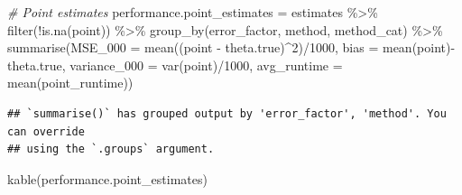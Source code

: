 \documentclass[
]{article}
\newenvironment{Shaded}{\begin{snugshade}}{\end{snugshade}}
\newcommand{\AttributeTok}[1]{\textcolor[rgb]{0.77,0.63,0.00}{#1}}
\newcommand{\CommentTok}[1]{\textcolor[rgb]{0.56,0.35,0.01}{\textit{#1}}}
\newcommand{\DecValTok}[1]{\textcolor[rgb]{0.00,0.00,0.81}{#1}}
\newcommand{\FunctionTok}[1]{\textcolor[rgb]{0.00,0.00,0.00}{#1}}
\newcommand{\NormalTok}[1]{#1}
\newcommand{\OtherTok}[1]{\textcolor[rgb]{0.56,0.35,0.01}{#1}}
\newcommand{\SpecialCharTok}[1]{\textcolor[rgb]{0.00,0.00,0.00}{#1}}
\begin{document}
\begin{Shaded}
\begin{Highlighting}[]
\CommentTok{\# Point estimates}
\NormalTok{performance.point\_estimates }\OtherTok{=}\NormalTok{ estimates }\SpecialCharTok{\%\textgreater{}\%}
  \FunctionTok{filter}\NormalTok{(}\SpecialCharTok{!}\FunctionTok{is.na}\NormalTok{(point)) }\SpecialCharTok{\%\textgreater{}\%}
  \FunctionTok{group\_by}\NormalTok{(error\_factor, method, method\_cat) }\SpecialCharTok{\%\textgreater{}\%}
  \FunctionTok{summarise}\NormalTok{(}\AttributeTok{MSE\_000 =} \FunctionTok{mean}\NormalTok{((point }\SpecialCharTok{{-}}\NormalTok{ theta.true)}\SpecialCharTok{\^{}}\DecValTok{2}\NormalTok{)}\SpecialCharTok{/}\DecValTok{1000}\NormalTok{,}
            \AttributeTok{bias =} \FunctionTok{mean}\NormalTok{(point)}\SpecialCharTok{{-}}\NormalTok{theta.true,}
            \AttributeTok{variance\_000 =} \FunctionTok{var}\NormalTok{(point)}\SpecialCharTok{/}\DecValTok{1000}\NormalTok{,}
            \AttributeTok{avg\_runtime =} \FunctionTok{mean}\NormalTok{(point\_runtime))}
\end{Highlighting}
\end{Shaded}

\begin{verbatim}
## `summarise()` has grouped output by 'error_factor', 'method'. You can override
## using the `.groups` argument.
\end{verbatim}

\begin{Shaded}
\begin{Highlighting}[]
\FunctionTok{kable}\NormalTok{(performance.point\_estimates)}
\end{Highlighting}
\end{Shaded}
\end{document}
